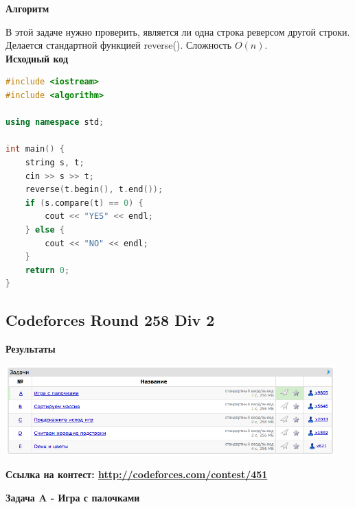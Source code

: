 \documentclass[a4paper,12pt]{article}
\begin{document}
\textbf{{\large Алгоритм}}

В этой задаче нужно проверить, является ли одна строка реверсом другой строки. Делается стандартной функцией reverse(). Сложность $O(n)$.\\

\textbf{{\large Исходный код}} \\
\begin{lstlisting}[language=C++]
#include <iostream>
#include <algorithm>

using namespace std;

int main() {
    string s, t;
    cin >> s >> t;
    reverse(t.begin(), t.end());
    if (s.compare(t) == 0) {
        cout << "YES" << endl;
    } else {
        cout << "NO" << endl;
    }
    return 0;
}
\end{lstlisting}




%
%

\newpage
\subsection{Codeforces Round 258 Div 2}

\textbf{{\large Результаты}} \\
\begin{center}
\includegraphics[width=0.95\textwidth]{C_258/result.png}\\ [1cm]
\end{center}

\textbf{{\large Ссылка на контест: \url{http://codeforces.com/contest/451}}}

\newpage
\textbf{{\large Задача A - Игра с палочками}}
\end{document}
